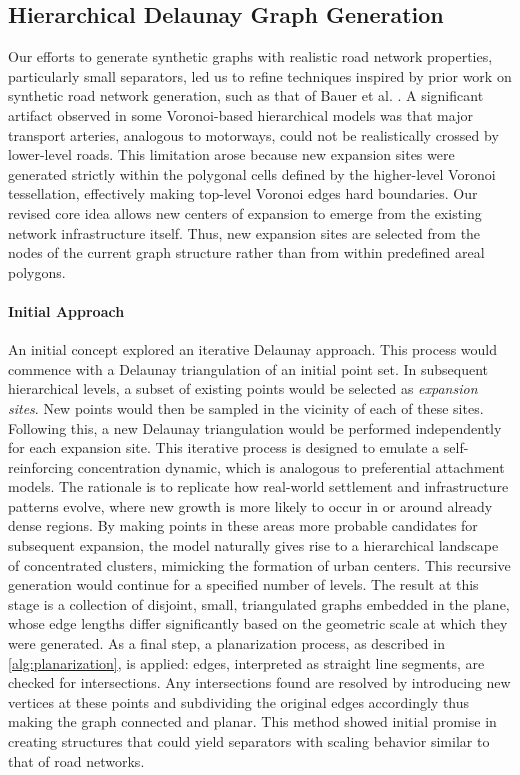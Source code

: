 \subsection{Hierarchical Delaunay Graph Generation}
\label{sec:hierarchical_delaunay_generation}

Our efforts to generate synthetic graphs with realistic road network properties, particularly small separators, led us to refine techniques inspired by prior work on synthetic road network generation, such as that of Bauer et al. \cite{hutchison_synthetic_2010}.
A significant artifact observed in some Voronoi-based hierarchical models was that major transport arteries, analogous to motorways, could not be realistically crossed by lower-level roads.
This limitation arose because new expansion sites were generated strictly within the polygonal cells defined by the higher-level Voronoi tessellation, effectively making top-level Voronoi edges hard boundaries.
Our revised core idea allows new centers of expansion to emerge from the existing network infrastructure itself. Thus, new expansion sites are selected from the nodes of the current graph structure rather than from within predefined areal polygons.

\paragraph{Initial Approach}

An initial concept explored an iterative Delaunay approach.
This process would commence with a Delaunay triangulation of an initial point set.
In subsequent hierarchical levels, a subset of existing points would be selected as \emph{expansion sites}.
New points would then be sampled in the vicinity of each of these sites.
Following this, a new Delaunay triangulation would be performed independently for each expansion site.
This iterative process is designed to emulate a self-reinforcing concentration dynamic, which is analogous to preferential attachment models.
The rationale is to replicate how real-world settlement and infrastructure patterns evolve, where new growth is more likely to occur in or around already dense regions.
By making points in these areas more probable candidates for subsequent expansion, the model naturally gives rise to a hierarchical landscape of concentrated clusters, mimicking the formation of urban centers.
This recursive generation would continue for a specified number of levels.
The result at this stage is a collection of disjoint, small, triangulated graphs embedded in the plane, whose edge lengths differ significantly based on the geometric scale at which they were generated.
As a final step, a planarization process, as described in \cref{alg:planarization}, is applied: edges, interpreted as straight line segments, are checked for intersections.
Any intersections found are resolved by introducing new vertices at these points and subdividing the original edges accordingly thus making the graph connected and planar.
This method showed initial promise in creating structures that could yield separators with scaling behavior similar to that of road networks.

